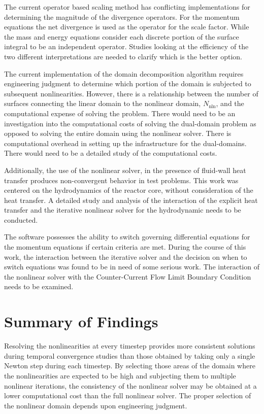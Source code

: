 The current operator based scaling method has conflicting implementations for determining the magnitude of the divergence operators.
For the momentum equations the net divergence is used as the operator for the scale factor.
While the mass and energy equations consider each discrete portion of the surface integral to be an independent operator.
Studies looking at the efficiency of the two different interpretations are needed to clarify which is the better option.

The current implementation of the domain decomposition algorithm requires engineering judgment to determine which portion of the domain is subjected to subsequent nonlinearities.
However, there is a relationship between the number of surfaces connecting the linear domain to the nonlinear domain, $N_{\text{nln}}$, and the computational expense of solving the problem.
There would need to be an investigation into the computational costs of solving the dual-domain problem as opposed to solving the entire domain using the nonlinear solver.
There is computational overhead in setting up the infrastructure for the dual-domains.
There would need to be a detailed study of the computational costs.

Additionally, the use of the nonlinear solver, in the presence of fluid-wall heat transfer produces non-convergent behavior in test problems.
This work was centered on the hydrodynamics of the reactor core, without consideration of the heat transfer.
A detailed study and analysis of the interaction of the explicit heat transfer and the iterative nonlinear solver for the hydrodynamic needs to be conducted.

The \cobra{} software possesses the ability to switch governing differential equations for the momentum equations if certain criteria are met.
During the course of this work, the interaction between the iterative solver and the decision on when to switch equations was found to be in need of some serious work.
The interaction of the nonlinear solver with the Counter-Current Flow Limit Boundary Condition  needs to be examined.

\section{Summary of Findings}
\label{sect:end:summary}
Resolving the nonlinearities at every timestep provides more consistent solutions during temporal convergence studies than those obtained by taking only a single Newton step during each timestep.
By selecting those areas of the domain where the nonlinearities are expected to be high and subjecting them to multiple nonlinear iterations, the consistency of the nonlinear solver may be obtained at a lower computational cost than the full nonlinear solver.
The proper selection of the nonlinear domain depends upon engineering judgment.


